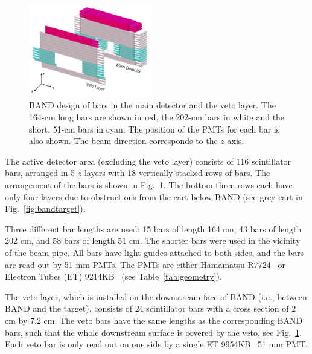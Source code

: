 \documentclass[review,number,sort&compress]{elsarticle}
\begin{document}
\begin{figure}[tb]
	\centering
			\includegraphics[width=0.48\textwidth]{band-schematic.jpg}
            \caption{BAND design of bars in the main
                   detector and the veto layer. The 164-\si{\centi\meter} long bars are shown in
                          red, the 202-\si{\centi\meter} bars in white
                          and the short, 51-\si{\centi\meter} bars in cyan. The position of
                          the PMTs for each bar is also shown. The beam direction corresponds to the $z$-axis.   }
		\label{fig:design}
\end{figure}

The active detector area (excluding the veto layer) consists of 116 scintillator bars, arranged
in 5 $z$-layers with 18 vertically stacked rows of bars. The arrangement of the
bars is shown in Fig.~\ref{fig:design}. The bottom three rows each have only
four layers due to obstructions from the cart below BAND (see grey cart in Fig.~\ref{fig:bandtarget}).

Three different bar lengths are used: 15 bars of length 164 \si{\centi\meter}, 43 bars of length 202 \si{\centi\meter}, and 58 bars of length 
51 \si{\centi\meter}. The shorter bars were used in the vicinity of
the beam pipe. All bars have light guides attached to both sides, and the bars
are read out by 51 \si{\milli\meter} PMTs. The PMTs are either Hamamatsu R7724~\cite{pmtR7724} or Electron Tubes (ET) 9214KB~\cite{pmt9214} (see Table~\ref{tab:geometry}).

The veto layer, which is installed on the downstream face of BAND
(i.e., between BAND and the target),
consists of 24 scintillator bars with a cross section of $2$
\si{\centi\meter} by $7.2$ \si{\centi\meter}. The veto bars have the
same lengths as the corresponding BAND bars, such that the whole
downstream surface is covered by the veto, see
Fig.~\ref{fig:design}. Each veto bar is only read out on one side by a
single ET 9954KB~\cite{pmt9954} 51 \si{\milli\meter} PMT.
\end{document}
